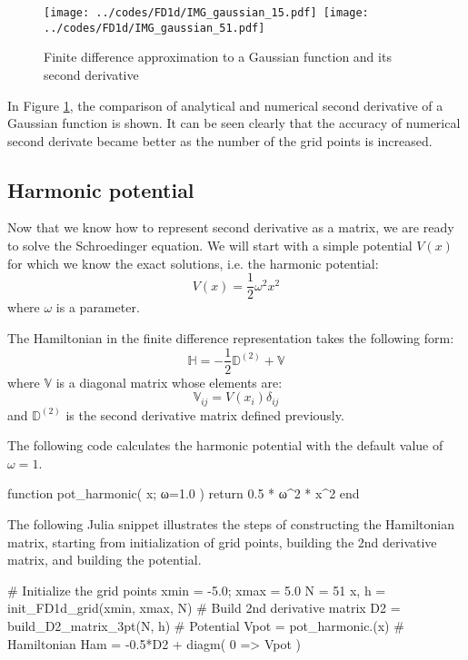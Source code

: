 \begin{figure}[H]
{\center
\texttt{[image: ../codes/FD1d/IMG\_gaussian\_15.pdf]}\,%
\texttt{[image: ../codes/FD1d/IMG\_gaussian\_51.pdf]}
\par}
\caption{Finite difference approximation to a Gaussian function and its second derivative}
\label{fig:compare_2nd_deriv}
\end{figure}

In Figure \ref{fig:compare_2nd_deriv}, the comparison of analytical and numerical second derivative of
a Gaussian function is shown. It can be seen clearly that the accuracy of numerical second derivate
became better as the number of the grid points is increased.


\subsection{Harmonic potential}

Now that we know how to represent second derivative as a matrix, we are ready to solve the Schroedinger equation.
We will start with a simple potential $V(x)$ for which we know the exact solutions, i.e. the harmonic potential:
\begin{equation}
V(x) = \frac{1}{2}\omega^2 x^2
\end{equation}
where $\omega$ is a parameter.

The Hamiltonian in the finite difference representation takes the following form:
\begin{equation}
\mathbb{H} = -\frac{1}{2}\mathbb{D}^{(2)} + \mathbb{V}
\end{equation}
where $\mathbb{V}$ is a diagonal matrix whose elements are:
\begin{equation}
\mathbb{V}_{ij} = V(x_{i})\delta_{ij}
\end{equation}
and $\mathbb{D}^{(2)}$ is the second derivative matrix defined previously.

The following code calculates the harmonic potential with the default value
of $\omega=1$.
\begin{juliacode}
function pot_harmonic( x; ω=1.0 )
    return 0.5 * ω^2 * x^2
end
\end{juliacode}

The following Julia snippet illustrates the steps of constructing the Hamiltonian matrix,
starting from initialization of grid points, building the 2nd derivative matrix, and building
the potential.
\begin{juliacode}
# Initialize the grid points
xmin = -5.0; xmax = 5.0
N = 51
x, h = init_FD1d_grid(xmin, xmax, N)
# Build 2nd derivative matrix
D2 = build_D2_matrix_3pt(N, h)
# Potential
Vpot = pot_harmonic.(x)
# Hamiltonian
Ham = -0.5*D2 + diagm( 0 => Vpot )
\end{juliacode}

